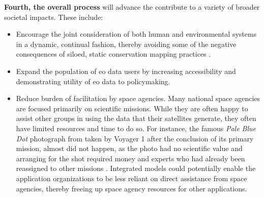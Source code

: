 \documentclass[notitlepage]{article}
\begin{document}
\textbf{Fourth, the overall process} will advance the contribute to a variety of broader societal impacts. These include:
\begin{itemize}
	\item Encourage the joint consideration of both human and environmental systems in a dynamic, continual fashion, thereby avoiding some of the negative consequences of siloed, static conservation mapping practices \cite{harrisRethinkingMapsMorethanhuman2011}. 
	\item Expand the population of \ac{eo} data users by increasing accessibility and demonstrating utility of \ac{eo} data to policymaking.
	\item Reduce burden of facilitation by space agencies. Many national space agencies are focused primarily on scientific missions. While they are often happy to assist other groups in using the data that their satellites generate, they often have limited resources and time to do so. For instance, the famous \textit{Pale Blue Dot} photograph from taken by Voyager 1 after the conclusion of its primary mission, almost did not happen, as the photo had no scientific value and arranging for the shot required money and experts who had already been reassigned to other missions \cite{greenfieldboycePaleBlueDot2010}. Integrated models could potentially enable the application organizations to be less reliant on direct assistance from space agencies, thereby freeing up space agency resources for other applications.
\end{itemize}

\newpage



\end{document}
